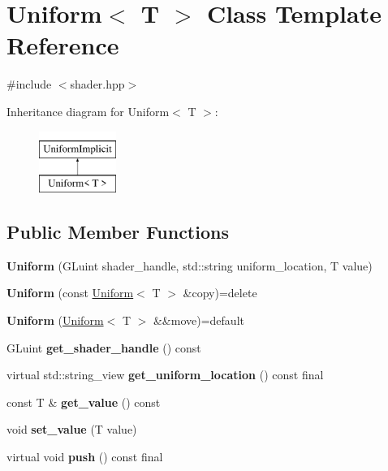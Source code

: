 \hypertarget{class_uniform}{}\section{Uniform$<$ T $>$ Class Template Reference}
\label{class_uniform}


{\ttfamily \#include $<$shader.\+hpp$>$}

Inheritance diagram for Uniform$<$ T $>$\+:\begin{figure}[H]
\begin{center}
\leavevmode
\includegraphics[height=2.000000cm]{class_uniform}
\end{center}
\end{figure}
\subsection*{Public Member Functions}
\begin{DoxyCompactItemize}
\item 
\mbox{\label{class_uniform_a3d219b0bb43be48b26bc40c0dc8e3d4f}} 
{\bfseries Uniform} (G\+Luint shader\+\_\+handle, std\+::string uniform\+\_\+location, T value)
\item 
\mbox{\label{class_uniform_a1648183f45498b00a7ad72cb2588217c}} 
{\bfseries Uniform} (const \mbox{\hyperlink{class_uniform}{Uniform}}$<$ T $>$ \&copy)=delete
\item 
\mbox{\label{class_uniform_a072b528f854a1e9c39af4292b1893821}} 
{\bfseries Uniform} (\mbox{\hyperlink{class_uniform}{Uniform}}$<$ T $>$ \&\&move)=default
\item 
\mbox{\label{class_uniform_a4018014ae7a377e136ad56baab73ec8b}} 
G\+Luint {\bfseries get\+\_\+shader\+\_\+handle} () const
\item 
\mbox{\label{class_uniform_a5ac04abebea4b8ab2c75e937795ec412}} 
virtual std\+::string\+\_\+view {\bfseries get\+\_\+uniform\+\_\+location} () const final
\item 
\mbox{\label{class_uniform_a932ed069688bd4086b0b0b7d197c3ee3}} 
const T \& {\bfseries get\+\_\+value} () const
\item 
\mbox{\label{class_uniform_abd3def6c98078007579bac6bb5806196}} 
void {\bfseries set\+\_\+value} (T value)
\item 
\mbox{\label{class_uniform_a6089ea0848616549c01c0fde1edaf1c9}} 
virtual void {\bfseries push} () const final
\end{DoxyCompactItemize}


